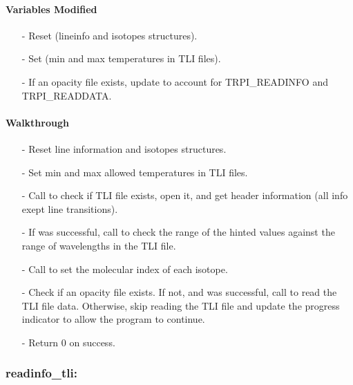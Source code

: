 \documentclass[letterpaper,12pt]{article}
\begin{document}
\paragraph{Variables Modified}
\begin{enumerate}[leftmargin=10pt, noitemsep, parsep=0pt, topsep=0ex]
\item[-] Reset  (lineinfo and
  isotopes structures).
\item[-] Set  (min and max temperatures in TLI files).
\item[-] If an opacity file exists, update  to account for TRPI\_READINFO and TRPI\_READDATA.
\end{enumerate}

\paragraph{Walkthrough}
\begin{enumerate}[leftmargin=10pt, noitemsep, parsep=0pt, topsep=0ex]
\item[-] Reset line information and isotopes structures.
\item[-] Set min and max allowed temperatures in TLI files.  
\item[-] Call  to check if TLI file exists, open it, and get header information (all info exept line transitions). 
\item[-] If  was successful, call  to check the range of the hinted values against the range of wavelengths in the TLI file.
\item[-] Call  to set the molecular index of each isotope. 
\item[-] Check if an opacity file exists. If not, and  was successful, call  to read the TLI file data. Otherwise, skip reading the TLI file and update the progress indicator to allow the program to continue.
\item[-] Return 0 on success.
\end{enumerate}


\subsubsection{readinfo\_tli:}
\end{document}
